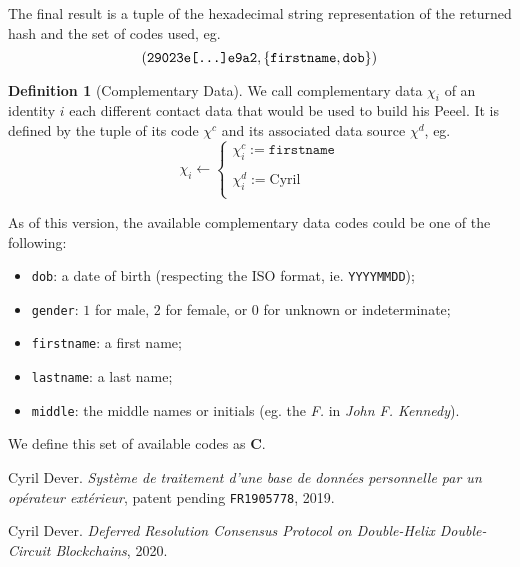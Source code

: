 \documentclass[twoside,twocolumn]{article}
\theoremstyle{definition}
\newtheorem{definition}{Definition}
\theoremstyle{remark}
\begin{document}
The final result is a tuple of the hexadecimal string representation of the returned hash and the set of codes used,
eg. $$(\texttt{29023e[\dots]e9a2}, \{ \texttt{firstname}, \texttt{dob} \})$$

\begin{definition}[Complementary Data]
    \label{complementaryData}
    We call complementary data $\chi_i$ of an identity $i$ each different contact data that would be used to build his Peeel.
    It is defined by the tuple of its code $\chi^c$ and its associated data source $\chi^d$, eg.$$
        \chi_i \gets \left\{
            \begin{array}{l}
                \chi_i^c := \texttt{firstname} \\ \\
                \chi_i^d := \textrm{Cyril} \\
            \end{array}
        \right.
    $$

    As of this version, the available complementary data codes could be one of the following:
    \begin{itemize}
        \item \texttt{dob}: a date of birth (respecting the ISO format, ie. \texttt{YYYYMMDD});
        \item \texttt{gender}: $1$ for male, $2$ for female, or $0$ for unknown or indeterminate;
        \item \texttt{firstname}: a first name;
        \item \texttt{lastname}: a last name;
        \item \texttt{middle}: the middle names or initials (eg. the \emph{F.} in \emph{John F. Kennedy}).
    \end{itemize}

    We define this set of available codes as $\mathcal{\textbf{C}}$.
\end{definition}




\begin{thebibliography}{99} %

Cyril Dever. \emph{Système de traitement d'une base de données personnelle par un opérateur extérieur}, patent pending \texttt{FR1905778}, 2019.

Cyril Dever. \emph{Deferred Resolution Consensus Protocol on Double-Helix Double-Circuit Blockchains}, 2020.

\end{thebibliography}

\end{document}

